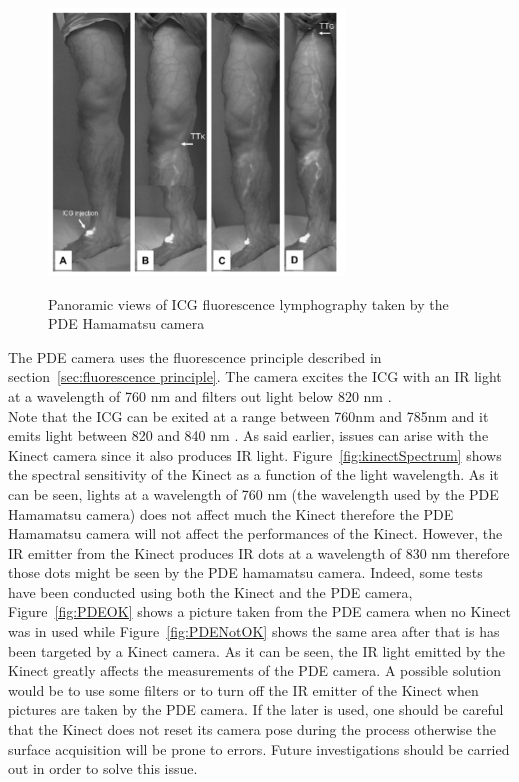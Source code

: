 \begin{figure}
\caption{Panoramic views of ICG fluorescence lymphography taken by the PDE Hamamatsu camera}
\centering
    \includegraphics[width=0.7\textwidth]{images/hamaResults0.png}
\label{fig:hamaResults0}
\end{figure}

The PDE camera uses the fluorescence principle described in section~\ref{sec:fluorescence principle}. The camera excites the ICG with an IR light at a wavelength of 760 nm \cite{tagaya_non-invasive_2010} and filters out light below 820 nm \cite{gotoh_novel_2009}. \\

Note that the ICG can be exited at a range between 760nm and 785nm and it emits light between 820 and 840 nm \cite{marshall_near-infrared_2010}. As said earlier, issues can arise with the Kinect camera since it also produces IR light. Figure~\ref{fig:kinectSpectrum} \cite{kolomenski_realization_2013} shows the spectral sensitivity of the Kinect as a function of the light wavelength. As it can be seen, lights at a wavelength of 760 nm (the wavelength used by the PDE Hamamatsu camera) does not affect much the Kinect therefore the PDE Hamamatsu camera will not affect the performances of the Kinect. However, the IR emitter from the Kinect produces IR dots at a wavelength of 830 nm \cite{kramer_introducing_2012} therefore those dots might be seen by the PDE hamamatsu camera. Indeed, some tests have been conducted using both the Kinect and the PDE camera, Figure~\ref{fig:PDEOK} shows a picture taken from the PDE camera when no Kinect was in used while Figure~\ref{fig:PDENotOK} shows the same area after that is has been targeted by a Kinect camera. As it can be seen, the IR light emitted by the Kinect greatly affects the measurements of the PDE camera. A possible solution would be to use some filters or to turn off the IR emitter of the Kinect when pictures are taken by the PDE camera. If the later is used, one should be careful that the Kinect does not reset its camera pose during the process otherwise the surface acquisition will be prone to errors. Future investigations should be carried out in order to solve this issue.\\
  
